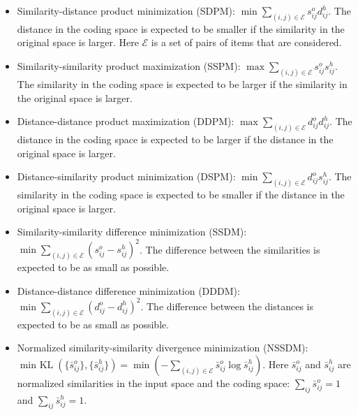 \documentclass[10pt,journal,compsoc]{IEEEtran}
\begin{document}
\begin{itemize}
\item Similarity-distance product minimization (SDPM):
$\operatorname{min} \sum_{(i,j) \in \mathcal{E}} s_{ij}^o d_{ij}^h$.
The distance in the coding space is expected to be smaller if the similarity in the original space is larger.
Here $\mathcal{E}$ is a set of pairs of items that are considered.

\item Similarity-similarity product maximization (SSPM):
$\operatorname{max} \sum_{(i,j) \in \mathcal{E}} s_{ij}^os_{ij}^h$.
The similarity in the coding space is expected to be larger if the similarity in the original space is larger.

\item Distance-distance product maximization (DDPM):
$\operatorname{max} \sum_{(i,j) \in \mathcal{E}} d_{ij}^od_{ij}^h$.
The distance in the coding space is expected to be larger if the distance in the original space is larger.

\item Distance-similarity product minimization (DSPM):
$\operatorname{min} \sum_{(i,j) \in \mathcal{E}} d_{ij}^os_{ij}^h$.
The similarity in the coding space is expected to be smaller if the distance in the original space is larger.

\item Similarity-similarity difference minimization (SSDM):
$\operatorname{min} \sum_{(i,j) \in \mathcal{E}} (s_{ij}^o-s_{ij}^h)^2$.
The difference between the similarities is expected to be as small as possible.

\item Distance-distance difference minimization (DDDM):
$\operatorname{min} \sum_{(i,j) \in \mathcal{E}} (d_{ij}^o - d_{ij}^h)^2$.
The difference between the distances is expected to be as small as possible.

\item Normalized similarity-similarity divergence minimization (NSSDM):\\
$\operatorname{min~KL}(\{\bar{s}_{ij}^o\}, \{\bar{s}_{ij}^h\}) = \operatorname{min} (-\sum_{(i,j) \in \mathcal{E}}\bar{s}_{ij}^o \operatorname{log} \bar{s}_{ij}^h)$.
Here $\bar{s}_{ij}^o$ and $\bar{s}_{ij}^h$
are normalized similarities in the input space and the coding space:
$\sum_{ij}\bar{s}_{ij}^o = 1$ and
$\sum_{ij}\bar{s}_{ij}^h = 1$.

\end{itemize}
\end{document}
